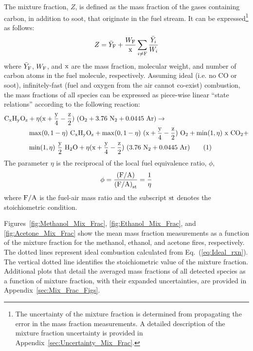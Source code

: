 \documentclass[12pt]{article}
\newcommand\numberthis{\addtocounter{equation}{1}\tag{\theequation}}
\begin{document}
The mixture fraction, $Z$, is defined as the mass fraction of the gases containing carbon, in addition to soot, that originate in the fuel stream. It can be expressed\footnote{The uncertainty of the mixture fraction is determined from propagating the error in the mass fraction measurements. A detailed description of the mixture fraction uncertainty is provided in Appendix~\ref{sec:Uncertainty_Mix_Frac}.} as follows:
\begin{equation}\label{eq:Mixture_Fraction}
  Z = \bar{Y}_{\rm F} + \frac{W_{\rm F}}{\rm x} \sum_{i\ne {\rm F}} \frac{\bar{Y}_i}{W_{i}}
\end{equation}
where $\bar{Y}_{\rm F}$, ${W_{\rm F}}$, and $\rm x$ are the mass fraction, molecular weight, and number of carbon atoms in the fuel molecule, respectively. Assuming ideal (i.e. no CO or soot), infinitely-fast (fuel and oxygen from the air cannot co-exist) combustion, the mass fractions of all species can be expressed as piece-wise linear ``state relations'' according to the following reaction:
\begin{align*}
{\rm C}_{\rm x}{\rm H}_{\rm y}{\rm O}_{\rm z} & +\eta(\rm x+\frac{\rm y}{4}-\frac{\rm z}{2})~({\rm O}_{2}+3.76~{\rm N}_{2}+0.0445~{\rm Ar}) \rightarrow  \\
          & \max(0,1-\eta)~{\rm C}_{\rm x}{\rm H}_{\rm y}{\rm O}_{\rm z}+\max(0,1-\eta)~(\rm x+\frac{\rm y}{4}-\frac{\rm z}{2})~{\rm O}_{2}+ \min(1,\eta)~\rm x~{\rm CO}_{2} +  \\
          & \min(1,\eta)~\frac{\rm y}{2}~{\rm H}_{2}{\rm O}+\eta(\rm x+\frac{\rm y}{4}-\frac{\rm z}{2})~(3.76~{\rm N}_{2}+0.0445~{\rm Ar})  \numberthis \label{eq:Ideal_rxn}
\end{align*}
The parameter $\eta$ is the reciprocal of the local fuel equivalence ratio, $\phi$,
\begin{equation}\label{eq:Eta}
\phi=\frac{\rm (F/A)}{{\rm (F/A)}_{\rm st}}=\frac{1}{\eta}
\end{equation}
where $\rm F/A$ is the fuel-air mass ratio and the subscript $\rm st$ denotes the stoichiometric condition.

Figures~\ref{fig:Methanol_Mix_Frac}, \ref{fig:Ethanol_Mix_Frac}, and \ref{fig:Acetone_Mix_Frac} show the mean mass fraction measurements as a function of the mixture fraction for the methanol, ethanol, and acetone fires, respectively. The dotted lines represent ideal combustion calculated from Eq.~(\ref{eq:Ideal_rxn}). The vertical dotted line identifies the stoichiometric value of the mixture fraction. Additional plots that detail the averaged mass fractions of all detected species as a function of mixture fraction, with their expanded uncertainties, are provided in Appendix~\ref{sec:Mix_Frac_Figs}.
\end{document}
